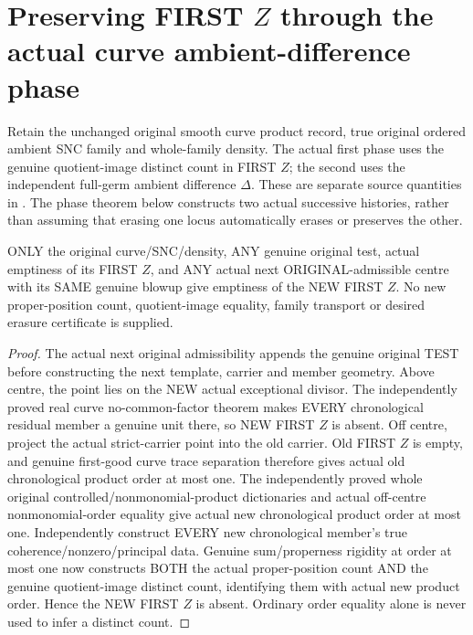\section{Preserving FIRST $Z$ through the actual curve ambient-difference phase}

Retain the unchanged original smooth curve product record, true original
ordered ambient SNC family and whole-family density. The actual first
phase uses the genuine quotient-image distinct count in FIRST $Z$; the
second uses the independent full-germ ambient difference $\Delta$.
These are separate source quantities in
\cite[\S12]{bierstone-milman97-invent-math}. The phase theorem below
constructs two actual successive histories, rather than assuming that
erasing one locus automatically erases or preserves the other.

\begin{theorem}
\label{hir:sharp-original-curve-first-defect-empty-preserved-step}
\leanok
ONLY the original curve/SNC/density, ANY genuine original test, actual
emptiness of its FIRST $Z$, and ANY actual next ORIGINAL-admissible
centre with its SAME genuine blowup give emptiness of the NEW FIRST $Z$.
No new proper-position count, quotient-image equality, family transport
or desired erasure certificate is supplied.
\end{theorem}
\begin{proof}
The actual next original admissibility appends the genuine original TEST
before constructing the next template, carrier and member geometry.
Above centre, the point lies on the NEW actual exceptional divisor.
The independently proved real curve no-common-factor theorem makes
EVERY chronological residual member a genuine unit there, so NEW FIRST
$Z$ is absent.
Off centre, project the actual strict-carrier point into the old carrier.
Old FIRST $Z$ is empty, and genuine first-good curve trace separation
therefore gives actual old chronological product order at most one.
The independently proved whole original controlled/nonmonomial-product
dictionaries and actual off-centre nonmonomial-order equality give actual
new chronological product order at most one. Independently construct
EVERY new chronological member's true coherence/nonzero/principal data.
Genuine sum/properness rigidity at order at most one now constructs BOTH
the actual proper-position count AND the genuine quotient-image distinct
count, identifying them with actual new product order. Hence the NEW
FIRST $Z$ is absent. Ordinary order equality alone is never used to infer
a distinct count.
\end{proof}

